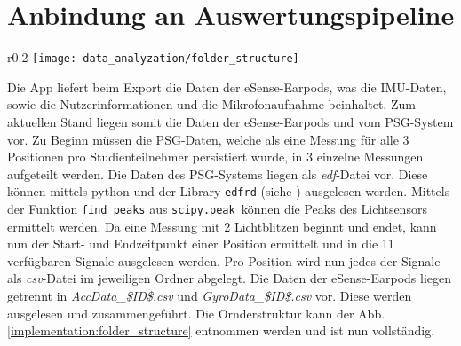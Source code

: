 
\section{Anbindung an Auswertungspipeline}
\begin{wrapfigure}{r}{0.2\textwidth}
  \centering
  \texttt{[image: data\_analyzation/folder\_structure]}
  \caption{Ornderstruktur des Datensatzes}
  \label{implementation:folder_structure}
\end{wrapfigure}
Die App liefert beim Export die Daten der eSense-Earpods, was die IMU-Daten, sowie die Nutzerinformationen und die Mikrofonaufnahme beinhaltet.
Zum aktuellen Stand liegen somit die Daten der eSense-Earpods und vom PSG-System vor. 
Zu Beginn müssen die PSG-Daten, welche als eine Messung für alle 3 Positionen pro Studienteilnehmer persistiert wurde, in 3 einzelne Messungen aufgeteilt werden.
Die Daten des PSG-Systems liegen als \textit{edf}-Datei vor. 
Diese können mittels python und der Library \texttt{edfrd} (siehe ) ausgelesen werden.
Mittels der Funktion \texttt{find\_peaks} aus \texttt{scipy.peak}\ können die Peaks des Lichtsensors ermittelt werden.
Da eine Messung mit 2 Lichtblitzen beginnt und endet, kann nun der Start- und Endzeitpunkt einer Position ermittelt und in die 11 verfügbaren Signale ausgelesen werden.
Pro Position wird nun jedes der Signale als \textit{csv}-Datei im jeweiligen Ordner abgelegt.
Die Daten der eSense-Earpods liegen getrennt in \textit{AccData\_\$ID\$.csv} und \textit{GyroData\_\$ID\$.csv} vor. 
Diese werden ausgelesen und zusammengeführt.
Die Ornderstruktur kann der Abb. \ref{implementation:folder_structure} entnommen werden und ist nun vollständig.

